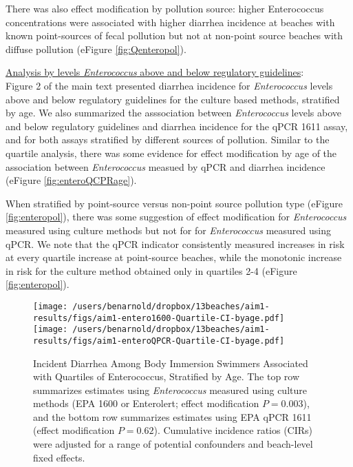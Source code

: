 \documentclass[12pt]{article}\usepackage[]{graphicx}\usepackage[]{color}
\begin{document}
There was also effect modification by pollution source: higher Enterococcus concentrations were associated with higher diarrhea incidence at beaches with known point-sources of fecal pollution but not at non-point source beaches with diffuse pollution (eFigure \ref{fig:Qenteropol}).

\medskip
\noindent \underline{Analysis by levels \textit{Enterococcus} above and below regulatory guidelines}: \\
Figure 2 of the main text presented diarrhea incidence for \textit{Enterococcus} levels above and below regulatory guidelines for the culture based methods, stratified by age. We also summarized the asssociation between \emph{Enterococcus} levels above and below regulatory guidelines and diarrhea incidence for the qPCR 1611 assay, and for both assays stratified by different sources of pollution. Similar to the quartile analysis, there was some evidence for effect modification by age of the association between \textit{Enterococcus} measued by qPCR and diarrhea incidence  (eFigure \ref{fig:enteroQCPRage}).  

When stratified by point-source versus non-point source pollution type (eFigure \ref{fig:enteropol}), there was some suggestion of effect modification for \textit{Enterococcus} measured using culture methods but not for for \textit{Enterococcus} measured using qPCR. We note that the qPCR indicator consistently measured increases in risk at every quartile increase at point-source beaches, while the monotonic increase in risk for the culture method obtained only in quartiles 2-4 (eFigure \ref{fig:enteropol}).


\begin{landscape}
\begin{figure}
\begin{center}
\texttt{[image: /users/benarnold/dropbox/13beaches/aim1-results/figs/aim1-entero1600-Quartile-CI-byage.pdf]} \\
\texttt{[image: /users/benarnold/dropbox/13beaches/aim1-results/figs/aim1-enteroQPCR-Quartile-CI-byage.pdf]}
\caption{Incident Diarrhea Among Body Immersion Swimmers Associated with Quartiles of Enterococcus, Stratified by Age. The top row summarizes estimates using \textit{Enterococcus} measured using culture methods (EPA 1600 or Enterolert; effect modification $P=0.003$), and the bottom row summarizes estimates using EPA qPCR 1611 (effect modification $P=0.62$).  Cumulative incidence ratios (CIRs) were adjusted for a range of potential confounders and beach-level fixed effects.   \label{fig:Qenteroage}}
\end{center}
\end{figure}
\end{landscape}
\end{document}
